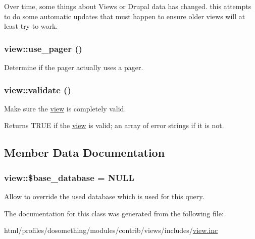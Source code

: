 Over time, some things about Views or Drupal data has changed. this attempts to do some automatic updates that must happen to ensure older views will at least try to work. \hypertarget{classview_aa8b3c1c132ab039dd24c13c2bccf5948}{
\subsubsection[{use\_\-pager}]{\setlength{\rightskip}{0pt plus 5cm}view::use\_\-pager ()}}
\label{classview_aa8b3c1c132ab039dd24c13c2bccf5948}
Determine if the pager actually uses a pager. \hypertarget{classview_a89950e757cb2da5094b1d413991fc353}{
\subsubsection[{validate}]{\setlength{\rightskip}{0pt plus 5cm}view::validate ()}}
\label{classview_a89950e757cb2da5094b1d413991fc353}
Make sure the \hyperlink{classview}{view} is completely valid.

\begin{DoxyReturn}{Returns}
TRUE if the \hyperlink{classview}{view} is valid; an array of error strings if it is not. 
\end{DoxyReturn}


\subsection{Member Data Documentation}
\hypertarget{classview_ac6f77ce6ed417261f155d4fbabc788f7}{
\subsubsection[{\$base\_\-database}]{\setlength{\rightskip}{0pt plus 5cm}view::\$base\_\-database = NULL}}
\label{classview_ac6f77ce6ed417261f155d4fbabc788f7}
Allow to override the used database which is used for this query. 

The documentation for this class was generated from the following file:\begin{DoxyCompactItemize}
\item 
html/profiles/dosomething/modules/contrib/views/includes/\hyperlink{views_2includes_2view_8inc}{view.inc}\end{DoxyCompactItemize}

